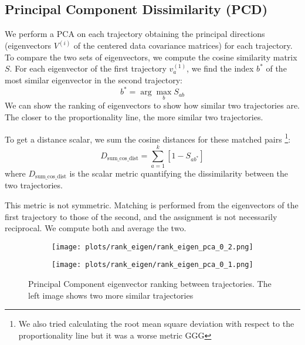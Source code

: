 \documentclass[a4paper,12pt]{article}
\begin{document}
\subsection{Principal Component Dissimilarity (PCD)}
\label{subsec:pca_distance} 


We perform a PCA on each trajectory obtaining the principal directions (eigenvectors $V^{(i)}$ of the centered data covariance matrices) for each trajectory. To compare the two sets of eigenvectors, we compute the cosine similarity matrix $S$.
For each eigenvector of the first trajectory $v^{(1)}_a$, we find the index $b^*$ of the most similar eigenvector in the second trajectory:
\[
b^* = \arg\max_b S_{ab}
\]
We can show the ranking of eigenvectors to show how similar two trajectories are. The closer to the proportionality line, the more similar two trajectories.

To get a distance scalar, we sum the cosine distances for these matched pairs \footnote{We also tried calculating the root mean square deviation with respect to the proportionality line but it was a worse metric GGG}:
\[
D_{\text{sum\_cos\_dist}} = \sum_{a=1}^k \left[1 - S_{a b^*}\right]
\]
where $D_{\text{sum\_cos\_dist}}$ is the scalar metric quantifying the dissimilarity between the two trajectories.

This metric is not symmetric. Matching is performed from the eigenvectors of the first trajectory to those of the second, and the assignment is not necessarily reciprocal. We compute both and average the two.

\begin{figure}[H]
    \centering
    \begin{subfigure}[b]{0.48\linewidth}
        \centering
        \texttt{[image: plots/rank\_eigen/rank\_eigen\_pca\_0\_2.png]}
    \end{subfigure}\hfill
    \begin{subfigure}[b]{0.48\linewidth}
        \centering
        \texttt{[image: plots/rank\_eigen/rank\_eigen\_pca\_0\_1.png]}
    \end{subfigure}
    \caption{Principal Component eigenvector ranking between trajectories. The left image shows two more similar trajectories} %
    \label{fig:rank_eigen}
\end{figure}
\end{document}
